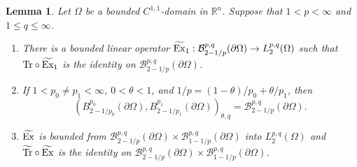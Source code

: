 \documentclass[reqno,centertags,11pt]{amsart}
\newtheorem{lem}[thm]{Lemma}
\theoremstyle{definition}
\numberwithin{thm}{section}
\numberwithin{equation}{section}
\newcommand{\R}{{\mathbb{R}}}
\begin{document}
\begin{lem}\label{trace results-2} Let  $\Omega$ be a  bounded $C^{1,1}$-domain in $\R^n$. Suppose  that   $1<p<\infty$ and    $1 \le q \le \infty$.
\begin{enumerate}[{\upshape(i)}]

\item  There is a bounded linear operator $\widetilde{\rm Ex}_1  : \mathcal B^{p,q}_{2-1/p}(\partial \Omega ) \rightarrow L_2^{p,q} (\Omega )$ such that ${\rm Tr} \circ \widetilde{\rm Ex}_1  $ is  the identity on $\mathcal B^{p,q}_{2-1/p}(\partial \Omega )$.
\item If  $1< p_0 \neq p_1 <\infty$,  $0< \theta <1$, and $1/p=(1-\theta)/p_0+\theta/p_1$,
then
\[
\left(  B^{p_0}_{2-1/p_0}(\partial \Omega ),  B^{p_1}_{2-1/p_1}(\partial \Omega ) \right)_{\theta,q}= \mathcal B^{p,q}_{2-1/p}(\partial \Omega ).
\]

\item 
    $\widetilde{\rm  Ex}$ is  bounded from $\mathcal B^{p,q}_{2-1/p}(\partial \Omega ) \times \mathcal  B^{p,q}_{1-1/p}(\partial \Omega )$ into $L_2^{p,q} (\Omega ) $
    and  
   $\widetilde{\rm Tr} \circ \widetilde{\rm  Ex} $ is  the identity on  $\mathcal  B^{p,q}_{2-1/p}(\partial \Omega ) \times \mathcal  B^{p,q}_{1-1/p}(\partial \Omega )$.

\end{enumerate}
\end{lem}
\end{document}
